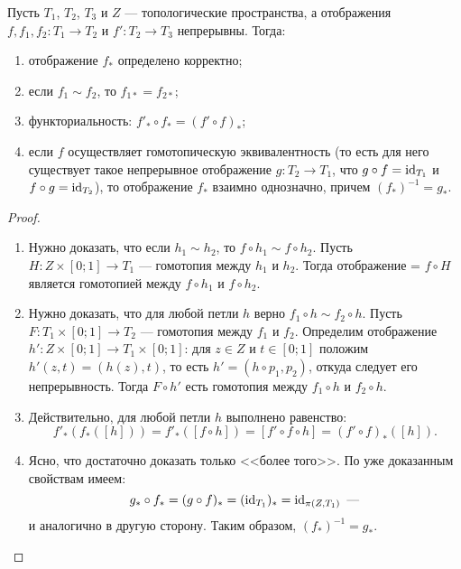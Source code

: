 \documentclass[main]{subfiles}
\begin{document}
\begin{statement}
	Пусть $ T_1 $, $ T_2 $, $ T_3 $ и $ Z $ --- топологические пространства, а отображения
	$ f, f_1, f_2 \colon T_1 \to T_2 $ и $ f' \colon T_2 \to T_3 $ непрерывны. Тогда:
	\begin{enumerate}
		\item отображение $ f_* $ определено корректно;
		\item если $ f_1 \sim f_2 $, то $ f_{1 *} = f_{2 *} $;
		\item функториальность: $ f'_* \circ f_* = ( f' \circ f )_* $;
		\item если $ f $ осуществляет гомотопическую эквивалентность (то есть для него существует такое
			непрерывное отображение $ g \colon T_2 \to T_1 $, что $ g \circ f = \operatorname{id}_{T_1} $ и
			$ f \circ g = \operatorname{id}_{T_2} $), то отображение $ f_* $ взаимно однозначно, причем $ (f_*)^{-1} = g_* $.
	\end{enumerate}
\end{statement}

\begin{proof} \leavevmode
	\begin{enumerate}
		\item Нужно доказать, что если $ h_1 \sim h_2 $, то $ f \circ h_1 \sim f \circ h_2 $. Пусть
			$ H \colon Z \times [0; 1] \to T_1 $ --- гомотопия между $ h_1 $ и $ h_2 $. Тогда отображение =
			$ f \circ H $ является гомотопией между $ f \circ h_1 $ и $ f \circ h_2 $.
		\item Нужно доказать, что для любой петли $ h $ верно $ f_1 \circ h \sim f_2 \circ h $. Пусть
			$ F \colon T_1 \times [0; 1] \to T_2 $ --- гомотопия между $ f_1 $ и $ f_2 $. Определим отображение
			$ h' \colon Z \times [0; 1] \to T_1 \times [0; 1] $: для $ z \in Z $ и $ t \in [0; 1] $ положим
			$ h'(z, t) = (h(z), t) $, то есть $ h' = (h \circ p_1, p_2) $, откуда следует его непрерывность.
			Тогда $ F \circ h' $ есть гомотопия между $ f_1 \circ h $ и $ f_2 \circ h $.
		\item Действительно, для любой петли $ h $ выполнено равенство:
			\[ f'_*(f_*([h])) = f'_*([f \circ h]) = [f' \circ f \circ h] = (f' \circ f)_*([h]). \]
		\item Ясно, что достаточно доказать только <<более того>>. По уже доказанным свойствам имеем:
			\[ g_* \circ f_* = (g \circ f)_* = (\operatorname{id}_{T_1})_* = \operatorname{id}_{\pi(Z, T_1)} \text{ ---} \]
			и аналогично в другую сторону. Таким образом, $ (f_*)^{-1} = g_* $.
	\end{enumerate}
\end{proof}
\end{document}
